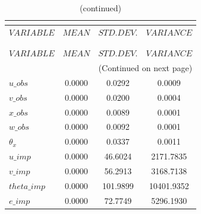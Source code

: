  
\begin{center}
\begin{longtable}{lccc} 
\caption{THEORETICAL MOMENTS}\\
 \label{Table:th_moments}\\
\toprule 
$VARIABLE    $	 & 	 $          MEAN$	 & 	 $     STD. DEV.$	 & 	 $      VARIANCE$\\
\midrule \endfirsthead 
\caption{(continued)}\\
 \toprule \\ 
$VARIABLE    $	 & 	 $          MEAN$	 & 	 $     STD. DEV.$	 & 	 $      VARIANCE$\\
\midrule \endhead 
\midrule \multicolumn{4}{r}{(Continued on next page)} \\ \bottomrule \endfoot 
\bottomrule \endlastfoot 
$u\_obs      $	 & 	        0.0000	 & 	        0.0292	 & 	        0.0009 \\ 
$v\_obs      $	 & 	        0.0000	 & 	        0.0200	 & 	        0.0004 \\ 
$x\_obs      $	 & 	        0.0000	 & 	        0.0089	 & 	        0.0001 \\ 
$w\_obs      $	 & 	        0.0000	 & 	        0.0092	 & 	        0.0001 \\ 
${\theta_x}  $	 & 	        0.0000	 & 	        0.0337	 & 	        0.0011 \\ 
$u\_imp      $	 & 	        0.0000	 & 	       46.6024	 & 	     2171.7835 \\ 
$v\_imp      $	 & 	        0.0000	 & 	       56.2913	 & 	     3168.7138 \\ 
$theta\_imp  $	 & 	        0.0000	 & 	      101.9899	 & 	    10401.9352 \\ 
$e\_imp      $	 & 	        0.0000	 & 	       72.7749	 & 	     5296.1930 \\ 
\end{longtable}
 \end{center}
